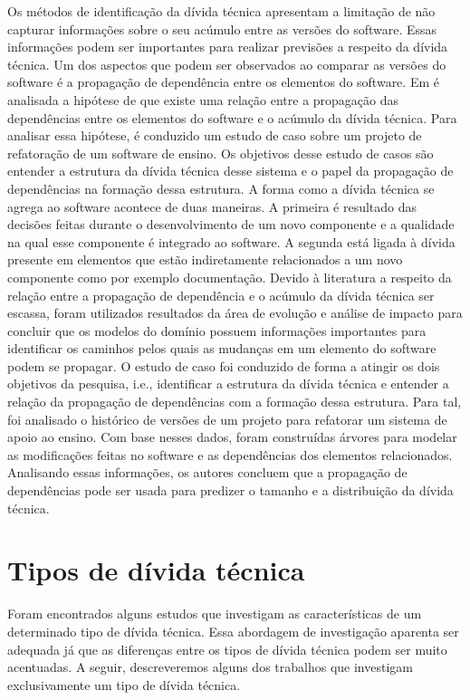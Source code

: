 Os métodos de identificação da dívida técnica apresentam a limitação de não capturar informações sobre o seu acúmulo entre as versões do software. Essas informações podem ser importantes para realizar previsões a respeito da dívida técnica. Um dos aspectos que podem ser observados ao comparar as versões do software é a propagação de dependência entre os elementos do software. Em \cite{inpHoLaRaKaLe13a} é analisada a hipótese de que existe uma relação entre a propagação das dependências entre  os  elementos do software e o acúmulo da dívida técnica. Para analisar essa hipótese, é conduzido um estudo de caso sobre um projeto de refatoração de um software de ensino. Os objetivos desse estudo de casos são entender a estrutura da dívida técnica desse sistema e o papel da propagação de dependências na formação dessa estrutura. A forma como a dívida técnica se agrega ao software acontece de duas maneiras. A primeira é resultado das decisões feitas durante o desenvolvimento de um novo componente e a qualidade na qual esse componente é integrado ao software. A segunda está ligada à dívida presente em elementos que estão indiretamente relacionados a um novo componente como por exemplo documentação. Devido à literatura a respeito da relação entre a propagação de dependência e o acúmulo da dívida técnica ser escassa, foram utilizados resultados da área de evolução e análise de impacto para concluir que os modelos do domínio possuem informações importantes para identificar os caminhos pelos quais as mudanças em um elemento do software podem se propagar.  O estudo de caso foi conduzido de forma a atingir os dois objetivos da pesquisa, i.e., identificar a estrutura da dívida técnica e entender a relação da propagação de dependências com a formação dessa estrutura. Para tal, foi analisado o histórico de versões de um projeto para refatorar um sistema de apoio ao ensino. Com base nesses dados, foram construídas árvores para modelar as modificações feitas no software e as dependências dos elementos relacionados. Analisando essas informações, os autores concluem que a propagação de dependências pode ser usada para predizer o tamanho e a distribuição da dívida técnica.

\section{Tipos de dívida técnica}

Foram encontrados alguns estudos que investigam as características de um determinado tipo de dívida técnica. Essa abordagem de investigação aparenta ser adequada já que as diferenças entre os tipos de dívida técnica podem ser muito acentuadas. A seguir, descreveremos alguns dos trabalhos que investigam exclusivamente um tipo de dívida técnica. 




